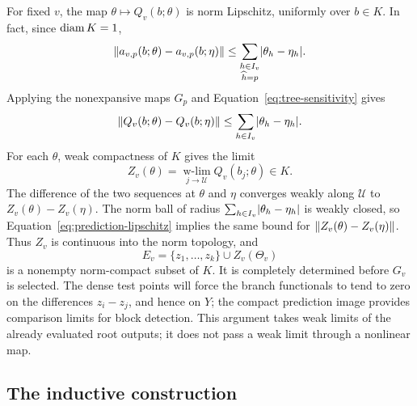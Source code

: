 For fixed $v$, the map $\theta\mapsto Q_v(b;\theta)$ is norm
Lipschitz, uniformly over $b\in K$.  In fact, since $\operatorname{diam} K=1$,
\[
 \lVert a_{v,p}(b;\theta)-a_{v,p}(b;\eta)\rVert
 \le \sum_{\substack{h\in I_v\\\widehat h=p}}
                      \lvert\theta_h-\eta_h\rvert.
\]
Applying the nonexpansive maps $G_p$ and
Equation~\eqref{eq:tree-sensitivity} gives
\begin{equation}
 \lVert Q_v(b;\theta)-Q_v(b;\eta)\rVert
 \le \sum_{h\in I_v}\lvert\theta_h-\eta_h\rvert.
 \label{eq:prediction-lipschitz}
\end{equation}
For each $\theta$, weak compactness of $K$ gives the limit
\[
 Z_v(\theta)=\operatorname*{w-lim}_{j\to\mathcal U}
                      Q_v(b_j;\theta)\in K.
\]
The difference of the two sequences at $\theta$ and $\eta$
converges weakly along $\mathcal U$ to
$Z_v(\theta)-Z_v(\eta)$.  The norm ball of radius
$\sum_{h\in I_v}\lvert\theta_h-\eta_h\rvert$ is weakly closed, so
Equation~\eqref{eq:prediction-lipschitz} implies the same bound for
$\lVert Z_v(\theta)-Z_v(\eta)\rVert$.  Thus $Z_v$ is continuous into the
norm topology, and
\begin{equation}
 E_v=\{z_1,\ldots,z_k\}\cup Z_v(\Theta_v)
 \label{eq:tree-detector-set}
\end{equation}
is a nonempty norm-compact subset of $K$.  It is completely
determined before $G_v$ is selected. The dense test points will force
the branch functionals to tend to zero on the differences $z_i-z_j$,
and hence on $Y$; the compact prediction image provides comparison
limits for block detection. This argument takes weak limits
of the already evaluated root outputs; it does not pass a weak
limit through a nonlinear map.

\subsection{The inductive construction}

